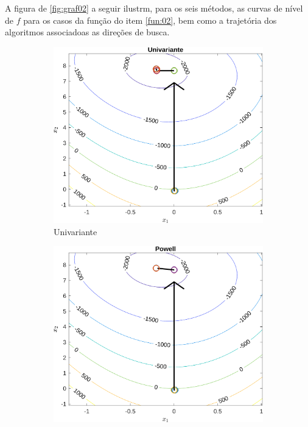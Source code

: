 \documentclass[10pt, a4paper]{article}
\begin{document}
A figura de \ref{fig:graf02} a seguir ilustrm, para os seis m\'etodos, as curvas de n\'ivel de $f$ para os casos da fun\c c\~ao do item \ref{fun:02}, bem como a trajet\'oria dos algoritmos associadoas as dire\c c\~oes de busca.

\begin{figure}[H]
      \centering
      \begin{subfigure}{0.45\textwidth}
            \includegraphics[width=\textwidth]{img02_m01.png}
            \caption{Univariante}
            \label{fig:graf02_m01}
      \end{subfigure}
      \begin{subfigure}{0.45\textwidth}
            \centering
            \includegraphics[width=\textwidth]{img02_m02.png}

\end{subfigure}
\end{figure}
\end{document}
